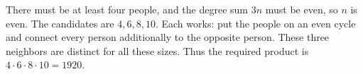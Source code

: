 There must be at least four people, and the degree sum $3n$ must be even, so $n$ is even. The candidates are $4,6,8,10$. Each works: put the people on an even cycle and connect every person additionally to the opposite person. These three neighbors are distinct for all these sizes. Thus the required product is $4\cdot6\cdot8\cdot10=\boxed{1920}$.
